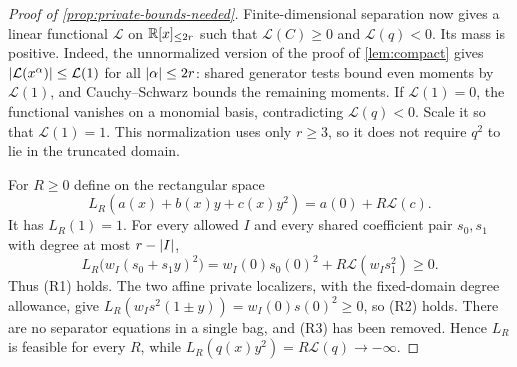 \begin{proof}[Proof of \cref{prop:private-bounds-needed}]
Finite-dimensional separation now gives a linear functional $\mathcal L$
on $\mathbb{R}[x]_{\le 2r}$ such that $\mathcal L(C)\ge0$ and $\mathcal L(q)<0$. Its
mass is positive. Indeed, the unnormalized version of the proof of
\cref{lem:compact} gives $\lvert \mathcal L(x^\alpha)\rvert\le\mathcal L(1)$ for all
$\lvert \alpha\rvert\le2r$: shared generator tests bound even moments by
$\mathcal L(1)$, and Cauchy--Schwarz bounds the remaining moments. If
$\mathcal L(1)=0$, the functional vanishes on a monomial basis, contradicting
$\mathcal L(q)<0$. Scale it so that $\mathcal L(1)=1$. This normalization uses
only $r\ge3$, so it does not require $q^2$ to lie in the truncated domain.

For $R\ge0$ define on the rectangular space
\[
 L_R(a(x)+b(x)y+c(x)y^2)=a(0)+R\mathcal L(c).
\]
It has $L_R(1)=1$. For every allowed $I$ and every shared coefficient
pair $s_0,s_1$ with degree at most $r-\lvert I\rvert$,
\[
 L_R\bigl(w_I(s_0+s_1y)^2\bigr)
 =w_I(0)s_0(0)^2+R\mathcal L(w_Is_1^2)\ge0.
\]
Thus (R1) holds. The two affine private localizers, with the fixed-domain
degree allowance, give
$L_R(w_Is^2(1\pm y))=w_I(0)s(0)^2\ge0$, so (R2) holds. There are no
separator equations in a single bag, and (R3) has been removed. Hence
$L_R$ is feasible for every $R$, while
$L_R(q(x)y^2)=R\mathcal L(q)\to-\infty$.
\end{proof}
